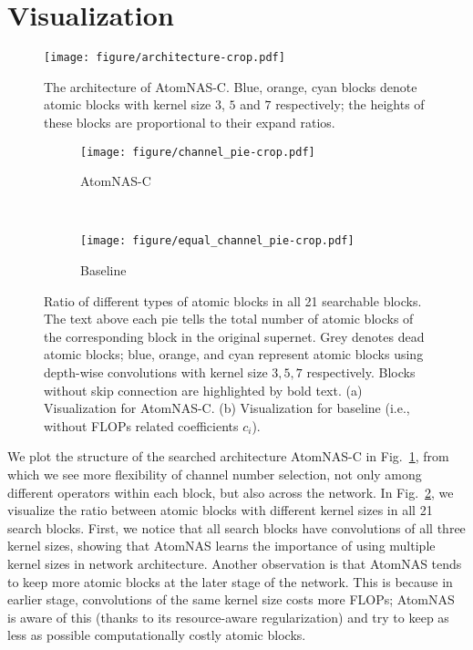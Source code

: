 \documentclass{article} \usepackage{iclr2020_conference,times}
\newcommand{\flops}{FLOPs\xspace}
\begin{document}



\appendix
\section{Visualization}\label{sec:vis}

\begin{figure}[htbp]
    \centering
    \texttt{[image: figure/architecture-crop.pdf]}
    \caption{The architecture of AtomNAS-C. Blue, orange, cyan blocks denote atomic blocks with kernel size $3$, $5$ and $7$ respectively; the heights of these blocks are proportional to their expand ratios.}
    \label{fig:atomnas_m_arch}
\end{figure}

\begin{figure}[btp]
    \begin{subfigure}[b]{\textwidth}
        \centering
        \texttt{[image: figure/channel\_pie-crop.pdf]}
        \caption{AtomNAS-C}
        \label{fig:mmodel_pie}
    \end{subfigure}
\\[3ex]
    \begin{subfigure}[b]{\textwidth}
        \centering
        \texttt{[image: figure/equal\_channel\_pie-crop.pdf]}
        \caption{Baseline}
        \label{fig:channel_pie_equal}
    \end{subfigure}
    \caption{Ratio of different types of atomic blocks in all 21 searchable blocks.
    The text above each pie tells the total number of atomic blocks of the corresponding block in the original supernet. Grey denotes dead atomic blocks; blue, orange, and cyan represent atomic blocks using depth-wise convolutions with kernel size $3,5,7$ respectively. Blocks without skip connection are highlighted by bold text.
    (a) Visualization for AtomNAS-C. (b) Visualization for baseline (i.e., without \flops related coefficients $c_i$).
    }
\end{figure}



We plot the structure of the searched architecture AtomNAS-C in Fig.~\ref{fig:atomnas_m_arch}, from which we see more flexibility of channel number selection, not only among different operators within each block, but also across the network. In Fig.~\ref{fig:mmodel_pie}, we visualize the ratio between atomic blocks with different kernel sizes in all 21 search blocks. First, we notice that all search blocks have convolutions of all three kernel sizes, showing that AtomNAS learns the importance of using multiple kernel sizes in network architecture. Another observation is that AtomNAS tends to keep more atomic blocks at the later stage of the network. This is because in earlier stage, convolutions of the same kernel size costs more \flops; AtomNAS is aware of this (thanks to its resource-aware regularization) and try to keep as less as possible computationally costly atomic blocks.
\end{document}
